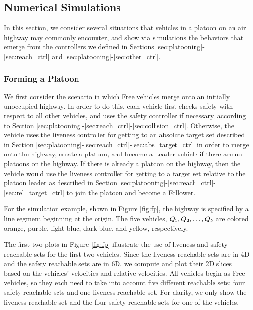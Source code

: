 \subsection{Numerical Simulations}
In this section, we consider several situations that vehicles in a platoon on an air highway may commonly encounter, and show via simulations the behaviors that emerge from the controllers we defined in Sections \ref{sec:platooning}-\ref{sec:reach_ctrl} and \ref{sec:platooning}-\ref{sec:other_ctrl}.

\subsubsection{Forming a Platoon}
We first consider the scenario in which Free vehicles merge onto an initially unoccupied highway. In order to do this, each vehicle first checks safety with respect to all other vehicles, and uses the safety controller if necessary, according to Section \ref{sec:platooning}-\ref{sec:reach_ctrl}-\ref{sec:collision_ctrl}. Otherwise, the vehicle uses the liveness controller for getting to an absolute target set described in Section \ref{sec:platooning}-\ref{sec:reach_ctrl}-\ref{sec:abs_target_ctrl} in order to merge onto the highway, create a platoon, and become a Leader vehicle if there are no platoons on the highway. If there is already a platoon on the highway, then the vehicle would use the liveness controller for getting to a target set relative to the platoon leader as described in Section \ref{sec:platooning}-\ref{sec:reach_ctrl}-\ref{sec:rel_target_ctrl} to join the platoon and become a Follower.

For the simulation example, shown in Figure \ref{fig:fp}, the highway is specified by a line segment beginning at the origin. The five vehicles, $Q_{1}, Q_{2}, \ldots, Q_{5}$ are colored orange, purple, light blue, dark blue, and yellow, respectively.

The first two plots in Figure \ref{fig:fp} illustrate the use of liveness and safety reachable sets for the first two vehicles. Since the liveness reachable sets are in 4D and the safety reachable sets are in 6D, we compute and plot their 2D slices based on the vehicles' velocities and relative velocities.  All vehicles begin as Free vehicles, so they each need to take into account five different reachable sets: four safety reachable sets and one liveness reachable set. For clarity, we only show the liveness reachable set and the four safety reachable sets for one of the vehicles. 

